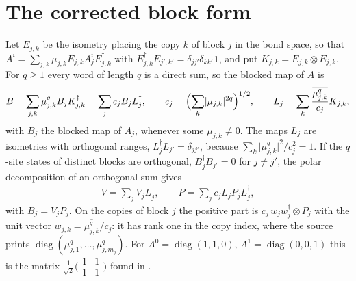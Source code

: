 \documentclass{article}
\begin{document}
\section{The corrected block form}
Let $E_{j,k}$ be the isometry placing the copy $k$ of block $j$ in the bond
space, so that $A^i=\sum_{j,k}\mu_{j,k}E_{j,k}A_j^iE_{j,k}^\dagger$ with
$E_{j,k}^\dagger E_{j',k'}=\delta_{jj'}\delta_{kk'}\mathbf 1$, and put
$K_{j,k}=E_{j,k}\otimes E_{j,k}$. For $q\geq1$ every word of length $q$ is a
direct sum, so the blocked map of $A$ is
\begin{align}
    B=\sum_{j,k}\mu_{j,k}^qB_jK_{j,k}^\dagger=\sum_jc_jB_jL_j^\dagger,
    \qquad
    c_j=\Bigl(\sum_k\lvert\mu_{j,k}\rvert^{2q}\Bigr)^{1/2},\qquad
    L_j=\sum_k\frac{\overline{\mu_{j,k}^q}}{c_j}K_{j,k},
    \label{eq:mswc24_rc_blocked}
\end{align}
with $B_j$ the blocked map of $A_j$, whenever some $\mu_{j,k}\neq0$. The maps
$L_j$ are isometries with orthogonal ranges, $L_j^\dagger L_{j'}=\delta_{jj'}$,
because $\sum_k\lvert\mu_{j,k}^q\rvert^2/c_j^2=1$. If the $q$-site states of
distinct blocks are orthogonal, $B_j^\dagger B_{j'}=0$ for $j\neq j'$, the polar
decomposition of an orthogonal sum \cite{gap:mswc24_block_form_mixed_overlap}
gives
\begin{align}
    V=\sum_jV_jL_j^\dagger,\qquad P=\sum_jc_jL_jP_jL_j^\dagger,
    \label{eq:mswc24_rc_polar}
\end{align}
with $B_j=V_jP_j$. On the copies of block $j$ the positive part is
$c_j\,w_jw_j^\dagger\otimes P_j$ with the unit vector
$w_{j,k}=\overline{\mu_{j,k}^q}/c_j$: it has rank one in the copy index, where
the source prints $\operatorname{diag}(\mu_{j,1}^q,\dots,\mu_{j,m_j}^q)$. For
$A^0=\operatorname{diag}(1,1,0)$, $A^1=\operatorname{diag}(0,0,1)$ this is the
matrix $\tfrac1{\sqrt2}\bigl(\begin{smallmatrix}1&1\\1&1\end{smallmatrix}\bigr)$
found in \cite{gap:mswc24_multiplicity_fixed_point}.
\end{document}
